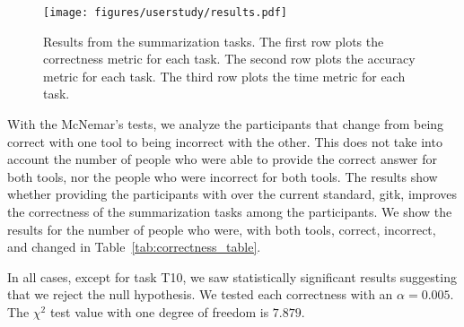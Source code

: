 \documentclass[draft]{IEEEtran}
\begin{document}
\begin{figure}[htpb]
  \centering
  \texttt{[image: figures/userstudy/results.pdf]}
  \caption{Results from the summarization tasks. The first row plots the
    correctness metric for each task. The second row plots the
    accuracy metric for each task. The third row plots the time metric
    for each task.}
  \label{fig:summarization_results}
\end{figure}

With the McNemar's tests, we analyze the participants that change from
being correct with one tool to being incorrect with the other. This does
not take into account the number of people who were able to provide the
correct answer for both tools, nor the people who were incorrect for both
tools. The results show whether providing the participants with \tool
over the current standard, gitk, improves the correctness of the
summarization tasks among the participants. We show the results for the
number of people who were, with both tools, correct, incorrect, and
changed in Table~\ref{tab:correctness_table}.

In all cases, except for task T10, we saw statistically significant
results suggesting that we reject the null hypothesis. We tested each
correctness with an $\alpha = 0.005$. The $\chi^2$ test value with one
degree of freedom is $7.879$.
\end{document}
